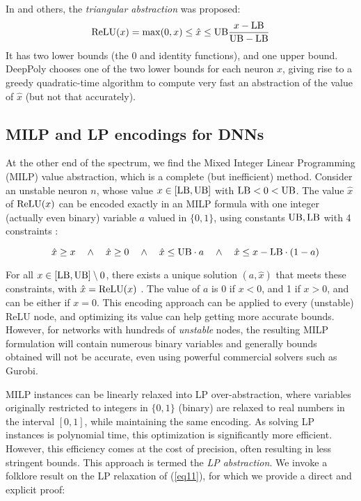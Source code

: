 In \cite{DBLP_Ehlers17,deeppoly} and others, the {\em triangular abstraction} was proposed:
\begin{align}
	\mathrm{ReLU}(x) = \max (0,x) \leq \hat{x} \leq \mathrm{UB} \frac{x-\mathrm{LB}}{\mathrm{UB}-\mathrm{LB}} 
	\label{eq:deeppoly}
\end{align} 
It has two lower bounds (the 0 and identity functions), and one upper bound. 
DeepPoly \cite{deeppoly} chooses one of the two lower bounds for each neuron $x$, giving rise to a greedy quadratic-time algorithm to compute very fast an abstraction of the value of $\hat{x}$ (but not that accurately).




\subsection{MILP and LP encodings for DNNs}

At the other end of the spectrum, we find the Mixed Integer Linear Programming (MILP) value abstraction, which is a complete (but inefficient) method. 
Consider an unstable neuron $n$, whose value $x \in [\mathrm{LB},\mathrm{UB}]$ with $\mathrm{LB}<0<\mathrm{UB}$.
The value $\hat{x}$ of $\mathrm{ReLU}(x)$ can be encoded exactly in an MILP formula with one 
integer (actually even binary) variable $a$ valued in $\{0,1\}$, using constants $\mathrm{UB},\mathrm{LB}$ with 4 constraints \cite{MILP}:

\vspace{-0.4cm}
\begin{equation}\quad \hat{x} \geq x \quad \wedge \quad \hat{x} \geq 0 \quad \wedge \quad \hat{x} \leq \mathrm{UB} \cdot a \quad \wedge \quad \hat{x} \leq x-\mathrm{LB} \cdot (1-a)
\label{eq11}
\end{equation}

For all $x \in [\mathrm{LB},\mathrm{UB}] \setminus 0$, there exists a unique solution $(a,\hat{x})$ that meets these constraints, with $\hat{x}=\mathrm{ReLU}(x)$ \cite{MILP}. The value of $a$ is 0 if $x < 0$, and 1 if $x>0$, and can be either if $x=0$. This encoding approach can be applied to every (unstable) ReLU node, and optimizing its value can help getting more accurate bounds. However, for networks with hundreds of {\em unstable} nodes, the resulting MILP formulation will contain numerous {binary variables} and generally bounds obtained will not be accurate, even using powerful commercial solvers such as Gurobi.

MILP instances can be linearly relaxed into LP over-abstraction, where variables originally restricted to integers in $\{0,1\}$ (binary) are relaxed to real numbers in the interval $[0,1]$, while maintaining the same encoding. As solving LP instances is polynomial time, this optimization is significantly more efficient. However, this efficiency comes at the cost of precision, often resulting in less stringent bounds. This approach is termed the {\em LP abstraction}. We invoke a folklore result on the LP relaxation of (\ref{eq11}), for which we provide a direct and explicit proof:

